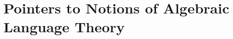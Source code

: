 \section{Pointers to Notions of Algebraic Language Theory}
\label{apdx:pointers-pin}

\begin{itemize}
\end{itemize}